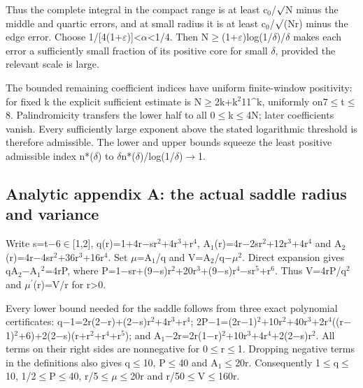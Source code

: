 \documentclass[11pt,a4paper]{article}
\begin{document}
Thus the complete integral in the compact range is at least c\ensuremath{_0}/\ensuremath{\surd}N minus the middle and quartic errors, and at small radius it is at least c\ensuremath{_0}/\ensuremath{\surd}(Nr) minus the edge error. Choose 1/[4(1+\ensuremath{\varepsilon})]<\ensuremath{\alpha}<1/4. Then N\ensuremath{\geq}(1+\ensuremath{\varepsilon})log(1/\ensuremath{\delta})/\ensuremath{\delta} makes each error a sufficiently small fraction of its positive core for small \ensuremath{\delta}, provided the relevant scale is large.

The bounded remaining coefficient indices have uniform finite-window positivity: for fixed k the explicit sufficient estimate is N\ensuremath{\geq}2k+k\ensuremath{^2}11\textasciicircum{}k, uniformly on7\ensuremath{\leq}t\ensuremath{\leq}8. Palindromicity transfers the lower half to all 0\ensuremath{\leq}k\ensuremath{\leq}4N; later coefficients vanish. Every sufficiently large exponent above the stated logarithmic threshold is therefore admissible. The lower and upper bounds squeeze the least positive admissible index n*(\ensuremath{\delta}) to \ensuremath{\delta}n*(\ensuremath{\delta})/log(1/\ensuremath{\delta})\ensuremath{\to}1.

\subsection{Analytic appendix A: the actual saddle radius and variance}
Write s=t\ensuremath{-}6\ensuremath{\in}[1,2], q(r)=1+4r\ensuremath{-}sr\ensuremath{^2}+4r\ensuremath{^3}+r\ensuremath{^4}, A\ensuremath{_1}(r)=4r\ensuremath{-}2sr\ensuremath{^2}+12r\ensuremath{^3}+4r\ensuremath{^4} and A\ensuremath{_2}(r)=4r\ensuremath{-}4sr\ensuremath{^2}+36r\ensuremath{^3}+16r\ensuremath{^4}. Set \ensuremath{\mu}=A\ensuremath{_1}/q and V=A\ensuremath{_2}/q\ensuremath{-}\ensuremath{\mu}\ensuremath{^2}. Direct expansion gives qA\ensuremath{_2}\ensuremath{-}A\ensuremath{_1}\ensuremath{^2}=4rP, where P=1\ensuremath{-}sr+(9\ensuremath{-}s)r\ensuremath{^2}+20r\ensuremath{^3}+(9\ensuremath{-}s)r\ensuremath{^4}\ensuremath{-}sr\ensuremath{^5}+r\ensuremath{^6}. Thus V=4rP/q\ensuremath{^2} and \ensuremath{\mu}\ensuremath{^{\prime}}(r)=V/r for r>0.

Every lower bound needed for the saddle follows from three exact polynomial certificates: q\ensuremath{-}1=2r(2\ensuremath{-}r)+(2\ensuremath{-}s)r\ensuremath{^2}+4r\ensuremath{^3}+r\ensuremath{^4}; 2P\ensuremath{-}1=(2r\ensuremath{-}1)\ensuremath{^2}+10r\ensuremath{^2}+40r\ensuremath{^3}+2r\ensuremath{^4}((r\ensuremath{-}1)\ensuremath{^2}+6)+2(2\ensuremath{-}s)(r+r\ensuremath{^2}+r\ensuremath{^4}+r\ensuremath{^5}); and A\ensuremath{_1}\ensuremath{-}2r=2r(1\ensuremath{-}r)\ensuremath{^2}+10r\ensuremath{^3}+4r\ensuremath{^4}+2(2\ensuremath{-}s)r\ensuremath{^2}. All terms on their right sides are nonnegative for 0\ensuremath{\leq}r\ensuremath{\leq}1. Dropping negative terms in the definitions also gives q\ensuremath{\leq}10, P\ensuremath{\leq}40 and A\ensuremath{_1}\ensuremath{\leq}20r. Consequently 1\ensuremath{\leq}q\ensuremath{\leq}10, 1/2\ensuremath{\leq}P\ensuremath{\leq}40, r/5\ensuremath{\leq}\ensuremath{\mu}\ensuremath{\leq}20r and r/50\ensuremath{\leq}V\ensuremath{\leq}160r.
\end{document}
